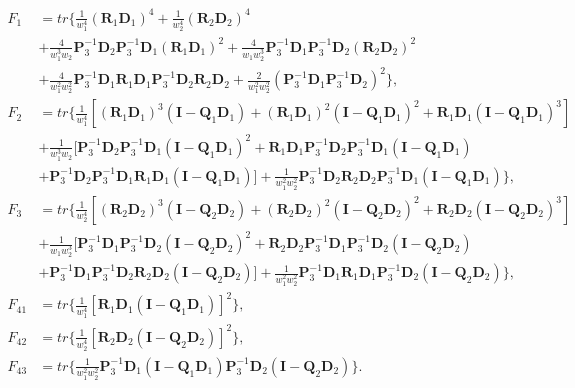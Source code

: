 \documentclass[12pt]{article}
\begin{document}
\begin{align*}
F_1 &= tr\{ \frac{1}{w_1^4} (\mathbf{R}_1 \mathbf{D}_1)^4 + \frac{1}{w_2^4} (\mathbf{R}_2 \mathbf{D}_2)^4  \\
    & + \frac{4}{w_1^3 w_2} \mathbf{P}_3^{-1} \mathbf{D}_2 \mathbf{P}_3^{-1} \mathbf{D}_1 (\mathbf{R}_1 \mathbf{D}_1)^2 + \frac{4}{w_1 w_2^3} \mathbf{P}_3^{-1} \mathbf{D}_1 \mathbf{P}_3^{-1} \mathbf{D}_2 (\mathbf{R}_2 \mathbf{D}_2)^2  \\
    & + \frac{4}{w_1^2 w_2^2} \mathbf{P}_3^{-1} \mathbf{D}_1 \mathbf{R}_1 \mathbf{D}_1 \mathbf{P}_3^{-1} \mathbf{D}_2 \mathbf{R}_2 \mathbf{D}_2 + \frac{2}{w_1^2 w_2^2} (\mathbf{P}_3^{-1} \mathbf{D}_1 \mathbf{P}_3^{-1} \mathbf{D}_2)^2  \},  \\
F_2 &= tr\{ \frac{1}{w_1^4} [ (\mathbf{R}_1 \mathbf{D}_1)^3 (\mathbf{I} - \mathbf{Q}_1 \mathbf{D}_1) + (\mathbf{R}_1 \mathbf{D}_1)^2 (\mathbf{I} - \mathbf{Q}_1 \mathbf{D}_1)^2 + \mathbf{R}_1 \mathbf{D}_1 (\mathbf{I} - \mathbf{Q}_1 \mathbf{D}_1)^3 ]  \\
    & + \frac{1}{w_1^3 w_2} [ \mathbf{P}_3^{-1} \mathbf{D}_2 \mathbf{P}_3^{-1} \mathbf{D}_1 (\mathbf{I} - \mathbf{Q}_1 \mathbf{D}_1)^2 + \mathbf{R}_1 \mathbf{D}_1 \mathbf{P}_3^{-1} \mathbf{D}_2 \mathbf{P}_3^{-1} \mathbf{D}_1 (\mathbf{I} - \mathbf{Q}_1 \mathbf{D}_1)  \\
    &+ \mathbf{P}_3^{-1} \mathbf{D}_2 \mathbf{P}_3^{-1} \mathbf{D}_1 \mathbf{R}_1 \mathbf{D}_1 (\mathbf{I} - \mathbf{Q}_1 \mathbf{D}_1) ] + \frac{1}{w_1^2 w_2^2} \mathbf{P}_3^{-1} \mathbf{D}_2 \mathbf{R}_2 \mathbf{D}_2 \mathbf{P}_3^{-1} \mathbf{D}_1 (\mathbf{I} - \mathbf{Q}_1 \mathbf{D}_1)  \},  \\
F_3 &= tr\{ \frac{1}{w_2^4} [ (\mathbf{R}_2 \mathbf{D}_2)^3 (\mathbf{I} - \mathbf{Q}_2 \mathbf{D}_2) + (\mathbf{R}_2 \mathbf{D}_2)^2 (\mathbf{I} - \mathbf{Q}_2 \mathbf{D}_2)^2 + \mathbf{R}_2 \mathbf{D}_2 (\mathbf{I} - \mathbf{Q}_2 \mathbf{D}_2)^3 ]  \\
    & + \frac{1}{w_1 w_2^3} [ \mathbf{P}_3^{-1} \mathbf{D}_1 \mathbf{P}_3^{-1} \mathbf{D}_2 (\mathbf{I} - \mathbf{Q}_2 \mathbf{D}_2)^2 + \mathbf{R}_2 \mathbf{D}_2 \mathbf{P}_3^{-1} \mathbf{D}_1 \mathbf{P}_3^{-1} \mathbf{D}_2 (\mathbf{I} - \mathbf{Q}_2 \mathbf{D}_2)  \\
    &+ \mathbf{P}_3^{-1} \mathbf{D}_1 \mathbf{P}_3^{-1} \mathbf{D}_2 \mathbf{R}_2 \mathbf{D}_2 (\mathbf{I} - \mathbf{Q}_2 \mathbf{D}_2) ] + \frac{1}{w_1^2 w_2^2} \mathbf{P}_3^{-1} \mathbf{D}_1 \mathbf{R}_1 \mathbf{D}_1 \mathbf{P}_3^{-1} \mathbf{D}_2 (\mathbf{I} - \mathbf{Q}_2 \mathbf{D}_2)  \},  \\
F_{41} &= tr\{ \frac{1}{w_1^4} [ \mathbf{R}_1 \mathbf{D}_1 (\mathbf{I} - \mathbf{Q}_1 \mathbf{D}_1) ]^2 \},  \\
F_{42} &= tr\{ \frac{1}{w_2^4} [ \mathbf{R}_2 \mathbf{D}_2 (\mathbf{I} - \mathbf{Q}_2 \mathbf{D}_2) ]^2 \},  \\
F_{43} &= tr\{ \frac{1}{w_1^2 w_2^2} \mathbf{P}_3^{-1} \mathbf{D}_1 (\mathbf{I} - \mathbf{Q}_1 \mathbf{D}_1) \mathbf{P}_3^{-1} \mathbf{D}_2 (\mathbf{I} - \mathbf{Q}_2 \mathbf{D}_2) \}.
\end{align*}
\end{document}
